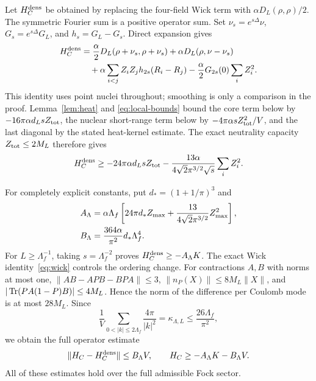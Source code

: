Let $H_C^{\rm dens}$ be obtained by replacing the four-field Wick
term with $\alpha D_L(\rho,\rho)/2$. The symmetric Fourier sum
is a positive operator sum. Set $\nu_s=e^{s\Delta}\nu$,
$G_s=e^{s\Delta}G_L$, and $h_s=G_L-G_s$. Direct expansion gives
\begin{align}
 H_C^{\rm dens}
 &=\frac\alpha2D_L(\rho+\nu_s,\rho+\nu_s)
   +\alpha D_L(\rho,\nu-\nu_s)\notag\\
 &\quad+\alpha\sum_{i<j}Z_iZ_jh_{2s}(R_i-R_j)
   -\frac\alpha2G_{2s}(0)\sum_iZ_i^2.
 \label{eq:heat-identity}
\end{align}
This identity uses point nuclei throughout; smoothing is only a
comparison in the proof. Lemma~\ref{lem:heat} and
\eqref{eq:local-bounds} bound the core term below by
$-16\pi\alpha d_LsZ_{\rm tot}$, the nuclear short-range term
below by $-4\pi\alpha sZ_{\rm tot}^2/V$, and the last diagonal
by the stated heat-kernel estimate. The exact neutrality capacity
$Z_{\rm tot}\le2M_L$ therefore gives
\begin{equation}
 H_C^{\rm dens}\ge-24\pi\alpha d_LsZ_{\rm tot}
 -\frac{13\alpha}{4\sqrt2\pi^{3/2}\sqrt s}\sum_iZ_i^2.
 \label{b-density-absolute}
\end{equation}

For completely explicit constants, put $d_*=(1+1/\pi)^3$ and
\begin{align}
 A_\Lambda&=\alpha\Lambda_f
 \left[24\pi d_*Z_{\max}
       +\frac{13}{4\sqrt2\pi^{3/2}}Z_{\max}^2\right],\notag\\
 B_\Lambda&=\frac{364\alpha}{\pi^2}d_*\Lambda_f^4.
 \label{b-absolute-constants}
\end{align}
For $L\ge\Lambda_f^{-1}$, taking $s=\Lambda_f^{-2}$ proves
$H_C^{\rm dens}\ge-A_\Lambda K$.
The exact Wick identity~\eqref{eq:wick} controls the ordering change.
For contractions $A,B$ with norms at most one,
$\|AB-APB-BPA\|\le3$, $\|n_P(X)\|\le8M_L\|X\|$,
and $|\operatorname{Tr}(PA(1-P)B)|\le4M_L$. Hence the norm of the difference
per Coulomb mode is at most $28M_L$. Since
\begin{equation}
 \frac1V\sum_{0<|k|\le2\Lambda_f}\frac{4\pi}{|k|^2}
 =\kappa_{\Lambda,L}\le\frac{26\Lambda_f}{\pi^2},
 \label{eq:coulomb-mode-sum}
\end{equation}
we obtain the full operator estimate
\begin{equation}
 \|H_C-H_C^{\rm dens}\|\le B_\Lambda V,
 \qquad H_C\ge-A_\Lambda K-B_\Lambda V.
 \label{eq:full-coulomb-bound}
\end{equation}
All of these estimates hold over the full admissible Fock sector.

